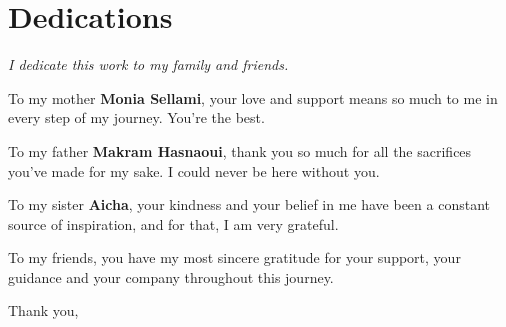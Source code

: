 \chapter*{\Huge Dedications}

\begingroup
\begin{center}
    \it \LARGE
I dedicate this work to my family and friends.

 
To my mother \textbf{Monia Sellami}, your love and support means so much to me in every step of my journey. You're the best.

To my father \textbf{Makram Hasnaoui}, thank you so much for all the sacrifices you've made for my sake. I could never be here without you.


To my sister \textbf{Aicha}, your kindness and your belief in me have been a constant source of inspiration, and for that, I am very grateful.

To my friends, you have my most sincere %
gratitude for your support, your guidance and your company throughout this journey. 

    \vspace{4mm}
\end{center}

\endgroup

\vspace{8mm}
\begin{flushright}
    \Large Thank you,\\
    \LARGE \@author
\end{flushright}